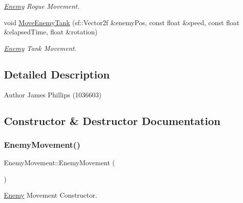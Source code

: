 \begin{DoxyCompactItemize}
\begin{DoxyCompactList}\small\item\em \hyperlink{class_enemy}{Enemy} Rogue Movement. \end{DoxyCompactList}\item 
void \hyperlink{class_enemy_movement_a91bd4b4f91b62660728ca2f5ac5062fd}{Move\+Enemy\+Tank} (sf\+::\+Vector2f \&enemy\+Pos, const float \&speed, const float \&elapsed\+Time, float \&rotation)
\begin{DoxyCompactList}\small\item\em \hyperlink{class_enemy}{Enemy} Tank Movement. \end{DoxyCompactList}\end{DoxyCompactItemize}


\subsection{Detailed Description}
\begin{DoxyAuthor}{Author}
James Phillips (1036603) 
\end{DoxyAuthor}


\subsection{Constructor \& Destructor Documentation}
\mbox{\label{class_enemy_movement_ac6f13581112bc274a27105efa6cfc7d7}} 
\subsubsection{\texorpdfstring{Enemy\+Movement()}{EnemyMovement()}}
{\footnotesize\ttfamily Enemy\+Movement\+::\+Enemy\+Movement (\begin{DoxyParamCaption}{ }\end{DoxyParamCaption})}



\hyperlink{class_enemy}{Enemy} Movement Constructor. 

\mbox{\label{class_enemy_movement_ae99f4997a60564fcb672030c7b0d3be2}} 
